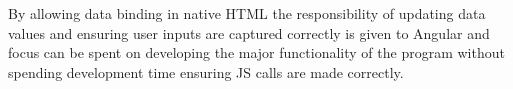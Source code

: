 \documentclass{l4proj}
\begin{document}

By allowing data binding in native HTML the responsibility of updating data values and ensuring user inputs are captured correctly is given to Angular and focus can be spent on developing the major functionality of the program without spending development time ensuring JS calls are made correctly. 
\end{document}
